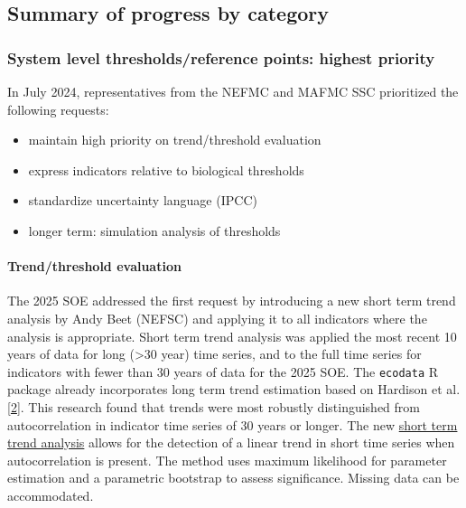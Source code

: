 \documentclass[
  10pt,
]{article}
\providecommand{\tightlist}{%
  \setlength{\itemsep}{0pt}\setlength{\parskip}{0pt}}
\begin{document}
\hypertarget{summary-of-progress-by-category}{%
\subsection{Summary of progress by
category}\label{summary-of-progress-by-category}}

\hypertarget{system-level-thresholdsreference-points-highest-priority}{%
\subsubsection{System level thresholds/reference points: highest
priority}\label{system-level-thresholdsreference-points-highest-priority}}

In July 2024, representatives from the NEFMC and MAFMC SSC prioritized
the following requests:

\begin{itemize}
\tightlist
\item
  maintain high priority on trend/threshold evaluation
\item
  express indicators relative to biological thresholds
\item
  standardize uncertainty language (IPCC)
\item
  longer term: simulation analysis of thresholds
\end{itemize}

\hypertarget{trendthreshold-evaluation}{%
\paragraph{Trend/threshold evaluation}\label{trendthreshold-evaluation}}

The 2025 SOE addressed the first request by introducing a new short term
trend analysis by Andy Beet (NEFSC) and applying it to all indicators
where the analysis is appropriate. Short term trend analysis was applied
the most recent 10 years of data for long (\textgreater30 year) time
series, and to the full time series for indicators with fewer than 30
years of data for the 2025 SOE. The \texttt{ecodata} R package already
incorporates long term trend estimation based on Hardison et al.
{[}\protect\hyperlink{ref-hardison_simulation_2019}{2}{]}. This research
found that trends were most robustly distinguished from autocorrelation
in indicator time series of 30 years or longer. The new
\href{https://noaa-edab.github.io/tech-doc/short-term-trend-analysis.html}{short
term trend analysis} allows for the detection of a linear trend in short
time series when autocorrelation is present. The method uses maximum
likelihood for parameter estimation and a parametric bootstrap to assess
significance. Missing data can be accommodated.
\end{document}
